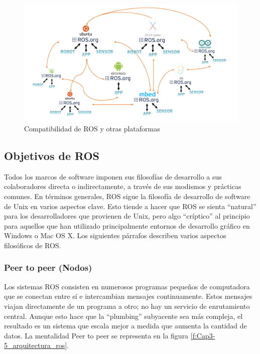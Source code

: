        \begin{figure}[htb]
            \centering
            \includegraphics[width=1.0\linewidth]{Main/Chapter3/Images3/3-4/compatibilidad-ros.png}
            \caption{Compatibilidad de ROS y otras plataformas \cite{ROS_BOOK_1}}
            \label{f:Cap3-4_compatibilidad_ros}
        \end{figure}
        
    \newpage

        
    \subsection{Objetivos de ROS}
    
        Todos los marcos de software imponen sus filosofías de desarrollo a sus colaboradores directa o indirectamente, a través de sus modismos y prácticas comunes. En términos generales, ROS sigue la filosofía de desarrollo de software de Unix en varios aspectos clave. Esto tiende a hacer que ROS se sienta ``natural'' para los desarrolladores que provienen de Unix, pero algo ``críptico'' al principio para aquellos que han utilizado principalmente entornos de desarrollo gráfico en Windows o Mac OS X. Los siguientes párrafos describen varios aspectos filosóficos de ROS.
        
        \subsubsection{Peer to peer (Nodos)}
        
            Los sistemas ROS consisten en numerosos programas pequeños de computadora que se conectan entre sí e intercambian mensajes continuamente. Estos mensajes viajan directamente de un programa a otro; no hay un servicio de enrutamiento central. Aunque esto hace que la ``plumbing'' subyacente sea más compleja, el resultado es un sistema que escala mejor a medida que aumenta la cantidad de datos. La mentalidad Peer to peer se representa en la figura \eqref{f:Cap3-5_arquitectura_ros}.
            

